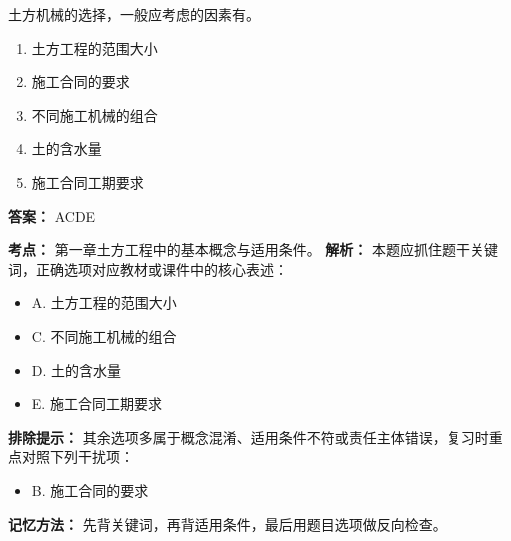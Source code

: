 \documentclass[UTF8,fontset=fandol,11pt]{ctexart}
\begin{document}
\vspace{0.2em}

\begin{quizbox}[title={第 7 题}]
土方机械的选择，一般应考虑的因素有。\\
\begin{enumerate}[label=\Alph*.]
\item 土方工程的范围大小
\item 施工合同的要求
\item 不同施工机械的组合
\item 土的含水量
\item 施工合同工期要求
\end{enumerate}
\textbf{答案：} ACDE
\vspace{0.25em}
\begin{answerbox}[title={考点解析}]
\textbf{考点：} 第一章土方工程中的基本概念与适用条件。
\textbf{解析：} 本题应抓住题干关键词，正确选项对应教材或课件中的核心表述：
\begin{itemize}
\item A. 土方工程的范围大小
\item C. 不同施工机械的组合
\item D. 土的含水量
\item E. 施工合同工期要求
\end{itemize}
\textbf{排除提示：} 其余选项多属于概念混淆、适用条件不符或责任主体错误，复习时重点对照下列干扰项：
\begin{itemize}
\item B. 施工合同的要求
\end{itemize}
\textbf{记忆方法：} 先背关键词，再背适用条件，最后用题目选项做反向检查。
\end{answerbox}
\end{quizbox}

\vspace{0.2em}
\end{document}
